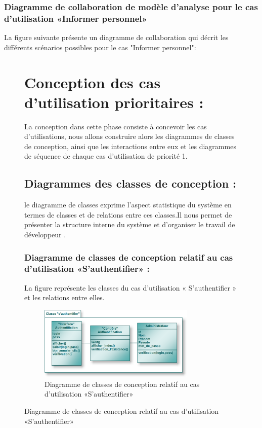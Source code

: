 \documentclass[12 pt]{report}
\begin{document}
\subsubsection{Diagramme  de  collaboration  de  modèle  d'analyse  pour  le  cas  d'utilisation «Informer personnel»  }
La figure suivante présente un diagramme de collaboration qui décrit les différents
scénarios possibles pour le cas "Informer personnel":
\begin{figure}[h]
\begin{center}
\section{Conception des cas d’utilisation prioritaires :}
La conception dans cette phase consiste à concevoir les cas d’utilisations, nous allons construire alors les diagrammes de classes de conception, ainsi que les interactions entre eux et les diagrammes de séquence de chaque cas d’utilisation de priorité 1.
\subsection{Diagrammes des classes de conception :}
le diagramme de classes exprime l'aspect statistique du système en termes de classes et de relations entre ces classes.Il nous permet de présenter la structure interne du système et d'organiser le travail de développeur .
\subsubsection{Diagramme de classes de conception relatif au cas d’utilisation «S’authentifier» :}
La figure  représente les classes du cas d’utilisation « S’authentifier » et les relations entre elles.
\begin{figure}[h]
 \begin{center}
\includegraphics[width= 12 cm ,height=  3.5cm]{cl_auth.PNG}
\caption{Diagramme de classes de conception relatif au cas d’utilisation «S’authentifier» }

\end{center}
\end{figure}

\end{center}
\end{figure}
\end{document}
